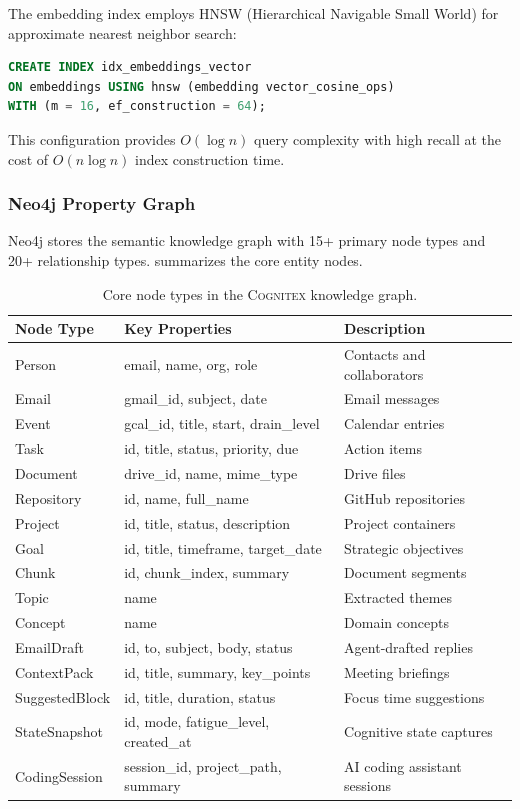 \documentclass[11pt,a4paper]{article}
\newcommand{\cognitex}{\textsc{Cognitex}}
\begin{document}
The embedding index employs HNSW (Hierarchical Navigable Small World) for approximate nearest neighbor search:

\begin{lstlisting}[language=SQL]
CREATE INDEX idx_embeddings_vector
ON embeddings USING hnsw (embedding vector_cosine_ops)
WITH (m = 16, ef_construction = 64);
\end{lstlisting}

This configuration provides $O(\log n)$ query complexity with high recall at the cost of $O(n \log n)$ index construction time.

\subsubsection{Neo4j Property Graph}

Neo4j stores the semantic knowledge graph with 15+ primary node types and 20+ relationship types.  summarizes the core entity nodes.

\begin{table}[t]
\centering
\caption{Core node types in the \cognitex{} knowledge graph.}
\label{tab:node_types}
\begin{tabular}{lll}
\toprule
\textbf{Node Type} & \textbf{Key Properties} & \textbf{Description} \\
\midrule
Person & email, name, org, role & Contacts and collaborators \\
Email & gmail\_id, subject, date & Email messages \\
Event & gcal\_id, title, start, drain\_level & Calendar entries \\
Task & id, title, status, priority, due & Action items \\
Document & drive\_id, name, mime\_type & Drive files \\
Repository & id, name, full\_name & GitHub repositories \\
Project & id, title, status, description & Project containers \\
Goal & id, title, timeframe, target\_date & Strategic objectives \\
Chunk & id, chunk\_index, summary & Document segments \\
Topic & name & Extracted themes \\
Concept & name & Domain concepts \\
EmailDraft & id, to, subject, body, status & Agent-drafted replies \\
ContextPack & id, title, summary, key\_points & Meeting briefings \\
SuggestedBlock & id, title, duration, status & Focus time suggestions \\
StateSnapshot & id, mode, fatigue\_level, created\_at & Cognitive state captures \\
CodingSession & session\_id, project\_path, summary & AI coding assistant sessions \\
\bottomrule
\end{tabular}
\end{table}
\end{document}
